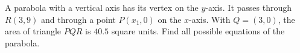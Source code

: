 A parabola with a vertical axis has its vertex on the $y$-axis. It passes through $R(3,9)$ and through a point $P(x_1,0)$ on the $x$-axis. With $Q=(3,0)$, the area of triangle $PQR$ is $40.5$ square units. Find all possible equations of the parabola.
